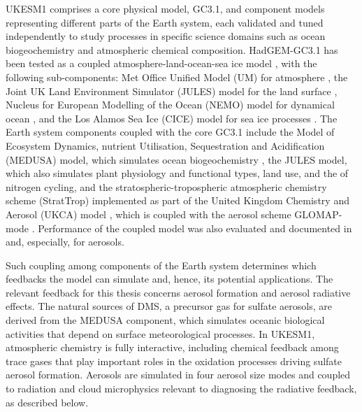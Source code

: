 UKESM1 comprises a core physical model, GC3.1, and component models representing different parts of the Earth system, each validated and tuned independently to study processes in specific science domains such as ocean biogeochemistry and atmospheric chemical composition. HadGEM-GC3.1 has been tested as a coupled atmosphere-land-ocean-sea ice model \citep{kuhlbrodtLowResolutionVersionHadGEM32018}, with the following sub-components: Met Office Unified Model (UM) for atmosphere \citep{waltersMetOfficeUnified2019}, the Joint UK Land Environment Simulator (JULES) model for the land surface \citep{bestJointUKLand2011}, Nucleus for European Modelling of the Ocean (NEMO) model for dynamical ocean \citep{storkeyUKGlobalOcean2018}, and the Los Alamos Sea Ice (CICE) model for sea ice processes \citep{ridleySeaIceModel2018}. The Earth system components coupled with the core GC3.1 include the Model of Ecosystem Dynamics, nutrient Utilisation, Sequestration and Acidification (MEDUSA) model, which simulates ocean biogeochemistry \citep{yoolMEDUSA2IntermediateComplexity2013}, the JULES model, which also simulates plant physiology and functional types, land use, and the of nitrogen cycling, and the stratospheric-tropospheric atmospheric chemistry scheme (StratTrop) implemented as part of the United Kingdom Chemistry and Aerosol (UKCA) model \citep{archibaldDescriptionEvaluationUKCA2020}, which is coupled with the aerosol scheme GLOMAP-mode \citep{mannDescriptionEvaluationGLOMAPmode2010}. Performance of the coupled model was also evaluated and documented in \citet{archibaldDescriptionEvaluationUKCA2020} and, especially, \citet{mulcahyDescriptionEvaluationAerosol2020} for aerosols.


Such coupling among components of the Earth system determines which feedbacks the model can simulate and, hence, its potential applications. The relevant feedback for this thesis concerns aerosol formation and aerosol radiative effects. The natural sources of DMS, a precursor gas for sulfate aerosols, are derived from the MEDUSA component, which simulates oceanic biological activities that depend on surface meteorological processes. In UKESM1, atmospheric chemistry is fully interactive, including chemical feedback among trace gases that play important roles in the oxidation processes driving sulfate aerosol formation. Aerosols are simulated in four aerosol size modes and coupled to radiation and cloud microphysics relevant to diagnosing the radiative feedback, as described below.


